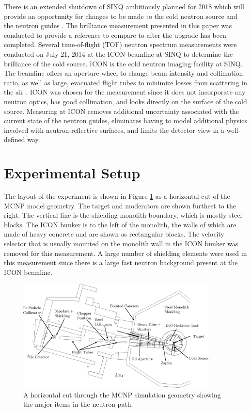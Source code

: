 \documentclass[5p,12pt]{elsarticle}
\begin{document}
There is an extended shutdown of SINQ ambitiously planned for 2018 which will provide an opportunity for changes to be made to the cold neutron source and the neutron guides \cite{rueegg_icans}.  The brilliance measurement presented in this paper was conducted to provide a reference to compare to after the upgrade has been completed.  Several time-of-flight (TOF) neutron spectrum measurements were conducted on July 21, 2014 at the ICON beamline at SINQ to determine the brilliance of the cold source.  ICON is the cold neutron imaging facility at SINQ.  The beamline offers an aperture wheel to change beam intensity and collimation ratio, as well as large, evacuated flight tubes to minimize losses from scattering in the air \cite{icon}.  ICON was chosen for the measurement since it does not incorporate any neutron optics, has good collimation, and looks directly on the surface of the cold source.  Measuring at ICON removes additional uncertainty associated with the current state of the neutron guides, eliminates having to model additional physics involved with neutron-reflective surfaces, and limits the detector view in a well-defined way.


%
%
%
%
%


\section{Experimental Setup}
\label{sec:setup}

The layout of the experiment is shown in Figure \ref{fig:geom} as a horizontal cut of the MCNP model geometry.  The target and moderators are shown furthest to the right.  The vertical line is the shielding monolith boundary, which is mostly steel blocks.  The ICON bunker is to the left of the monolith, the walls of which are made of heavy concrete and are shown as rectangular blocks.  The velocity selector that is usually mounted on the monolith wall in the ICON bunker was removed for this measurement.  A large number of shielding elements were used in this measurement since there is a large fast neutron background present at the ICON beamline.

\begin{figure}[ht!] 
  \centering
    \includegraphics[width=0.9\textwidth]{graphics/geom_bw_labels.eps}
     \caption{A horizontal cut through the MCNP simulation geometry showing the major items in the neutron path. \label{fig:geom} }
\end{figure}
\end{document}
